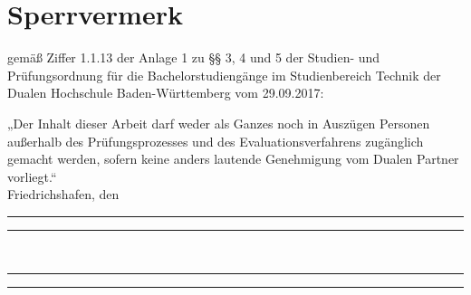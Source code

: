 \chapter*{Sperrvermerk}

gemäß Ziffer 1.1.13 der Anlage 1 zu §§ 3, 4 und 5 der Studien- und Prüfungsordnung für die Bachelorstudiengänge im Studienbereich Technik der Dualen Hochschule Baden-Württemberg vom 29.09.2017:

„Der Inhalt dieser Arbeit darf weder als Ganzes noch in Auszügen Personen außerhalb des Prüfungsprozesses und des Evaluationsverfahrens zugänglich gemacht werden, sofern keine anders lautende Genehmigung vom Dualen Partner vorliegt.“\\[2ex]

Friedrichshafen, den \datum\\[1ex]

\rule[-0.2cm]{5cm}{0.5pt} 
\hspace{1.5cm}
\rule[-0.2cm]{5cm}{0.5pt} \\

\rule[-0.2cm]{5cm}{0.5pt} 
\hspace{1.5cm}
\rule[-0.2cm]{5cm}{0.5pt} \\

\autor

\clearpage